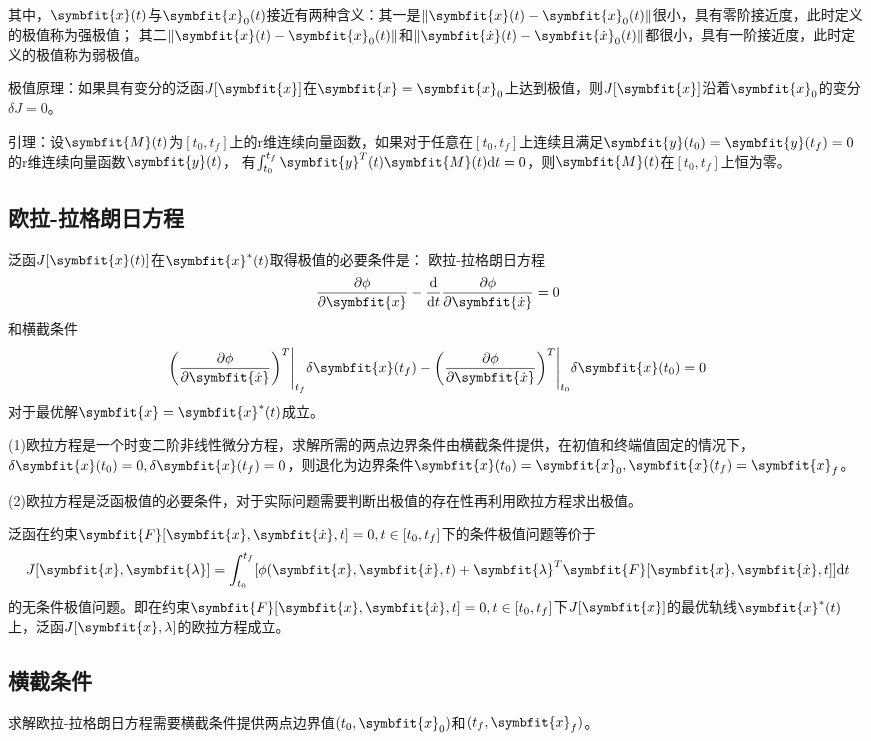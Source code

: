 \documentclass[11pt,a4paper]{ctexart}
\renewcommand{\d}{{\rm d}}
\newcommand{\bm}{\symbfit}
\begin{document}
            其中，$\bm{x}(t)$与$\bm{x}_0(t)$接近有两种含义：其一是$\|\bm{x}(t)-\bm{x}_0(t)\|$很小，具有零阶接近度，此时定义的极值称为强极值；
            其二$\|\bm{x}(t)-\bm{x}_0(t)\|$和$\|\bm{\dot x}(t)-\bm{\dot x}_0(t)\|$都很小，具有一阶接近度，此时定义的极值称为弱极值。

            极值原理：如果具有变分的泛函$J[\bm{x}]$在$\bm{x}=\bm{x}_0$上达到极值，则$J[\bm{x}]$沿着$\bm{x}_0$的变分$\delta J=0$。

            引理：设$\bm{M}(t)$为$[t_0,t_f]$上的r维连续向量函数，如果对于任意在$[t_0,t_f]$上连续且满足$\bm{y}(t_0)=\bm{y}(t_f)=0$的r维连续向量函数$\bm{y}(t)$，
            有$\int_{t_0}^{t_f}\bm{y}^T(t)\bm{M}(t)\d t=0$，则$\bm{M}(t)$在$[t_0,t_f]$上恒为零。
    \subsection{欧拉-拉格朗日方程}
        泛函$J[\bm{x}(t)]$在$\bm{x}^*(t)$取得极值的必要条件是：\newline        
        欧拉-拉格朗日方程
        \[
        \dfrac{\partial\phi}{\partial\bm{x}}-\dfrac{\d}{\d t}\dfrac{\partial\phi}{\partial\bm{\dot x}}=0
        \]
        和横截条件
        \[
        \bigg(\dfrac{\partial\phi}{\partial\bm{\dot x}}\bigg)^T\Bigg|_{t_f}\delta\bm{x}(t_f)-\bigg(\dfrac{\partial\phi}{\partial\bm{\dot x}}\bigg)^T\Bigg|_{t_0}\delta\bm{x}(t_0)=0
        \]
        对于最优解$\bm{x}=\bm{x}^*(t)$成立。

        (1)欧拉方程是一个时变二阶非线性微分方程，求解所需的两点边界条件由横截条件提供，在初值和终端值固定的情况下，$\delta\bm{x}(t_0)=0,\delta\bm{x}(t_f)=0$，则退化为边界条件$\bm{x}(t_0)=\bm{x}_0,\bm{x}(t_f)=\bm{x}_f$。

        (2)欧拉方程是泛函极值的必要条件，对于实际问题需要判断出极值的存在性再利用欧拉方程求出极值。

        泛函在约束$\bm{F}[\bm{x},\bm{\dot x},t]=0,t\in[t_0,t_f]$下的条件极值问题等价于
        \[
        J[\bm{x},\bm{\lambda}]=\int_{t_0}^{t_f}[\phi(\bm{x},\bm{\dot x},t)+\bm{\lambda}^T\bm{F}[\bm{x},\bm{\dot x},t]]\d t
        \]
        的无条件极值问题。即在约束$\bm{F}[\bm{x},\bm{\dot x},t]=0,t\in[t_0,t_f]$下$J[\bm{x}]$的最优轨线$\bm{x}^*(t)$上，泛函$J[\bm{x},\lambda]$的欧拉方程成立。
    \subsection{横截条件}
        求解欧拉-拉格朗日方程需要横截条件提供两点边界值$(t_0,\bm{x}_0)$和$(t_f,\bm{x}_f)$。
\end{document}
